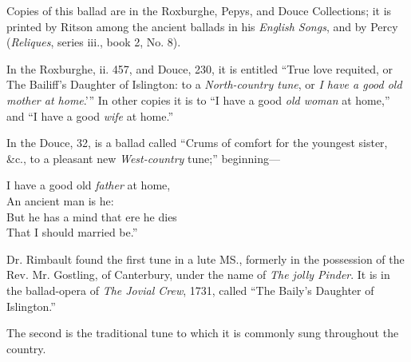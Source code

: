 
Copies of this ballad are in the Roxburghe, Pepys, and Douce Collections; it is
printed by Ritson among the ancient ballads in his \textit{English Songs}, and by Percy
(\textit{Reliques}, series iii., book 2, No. 8).

In the Roxburghe, ii. 457, and Douce, 230, it is entitled “True love requited,
or The Bailiff’s Daughter of Islington: to a \textit{North-country tune}, or \textit{I have a good
old mother at home}.'” In other copies it is to “I have a good \textit{old woman} at home,”
and “I have a good \textit{wife} at home.”

In the Douce, 32, is a ballad called “Crums of comfort for the youngest sister,
\&c., to a pleasant new \textit{West-country} tune;” beginning—
\begin{scverse}\begin{altverse}
I have a good old \textit{father} at home,\\
An ancient man is he:\\
But he has a mind that ere he dies\\
That I should married be.”
\end{altverse}
\end{scverse}

Dr. Rimbault found the first tune in a lute MS., formerly in the possession of
the Rev. Mr. Gostling, of Canterbury, under the name of \textit{The jolly Pinder}. It is
in the ballad-opera of \textit{The Jovial Crew}, 1731, called “The Baily’s Daughter of
Islington.”

The second is the traditional tune to which it is commonly sung throughout the
country.



\vspace{-1.5\baselineskip}

